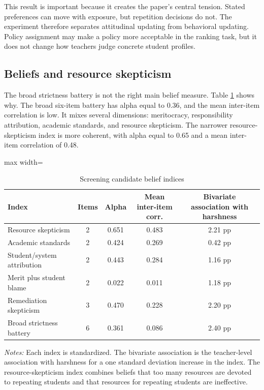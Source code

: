 \documentclass[12pt,a4paper]{article}
\newcommand{\tabnote}[1]{\vspace{0.3em}\parbox{0.94\textwidth}{\footnotesize \textit{Notes:} #1}}
\begin{document}
This result is important because it creates the paper's central tension. Stated preferences can move with exposure, but repetition decisions do not. The experiment therefore separates attitudinal updating from behavioral updating. Policy assignment may make a policy more acceptable in the ranking task, but it does not change how teachers judge concrete student profiles.

\subsection{Beliefs and resource skepticism}

The broad strictness battery is not the right main belief measure. Table \ref{tab:index_screen} shows why. The broad six-item battery has alpha equal to 0.36, and the mean inter-item correlation is low. It mixes several dimensions: meritocracy, responsibility attribution, academic standards, and resource skepticism. The narrower resource-skepticism index is more coherent, with alpha equal to 0.65 and a mean inter-item correlation of 0.48.

\begin{table}[!htbp]
\centering
\caption{Screening candidate belief indices}
\label{tab:index_screen}
\begin{threeparttable}
\begin{adjustbox}{max width=\textwidth}
\begin{tabular}{lcccc}
\toprule
Index & Items & Alpha & Mean inter-item corr. & Bivariate association with harshness \\
\midrule
Resource skepticism & 2 & 0.651 & 0.483 & 2.21 pp \\
Academic standards & 2 & 0.424 & 0.269 & 0.42 pp \\
Student/system attribution & 2 & 0.443 & 0.284 & 1.16 pp \\
Merit plus student blame & 2 & 0.022 & 0.011 & 1.18 pp \\
Remediation skepticism & 3 & 0.470 & 0.228 & 2.20 pp \\
Broad strictness battery & 6 & 0.361 & 0.086 & 2.40 pp \\
\bottomrule
\end{tabular}
\end{adjustbox}
\tabnote{Each index is standardized. The bivariate association is the teacher-level association with harshness for a one standard deviation increase in the index. The resource-skepticism index combines beliefs that too many resources are devoted to repeating students and that resources for repeating students are ineffective.}
\end{threeparttable}
\end{table}
\end{document}
